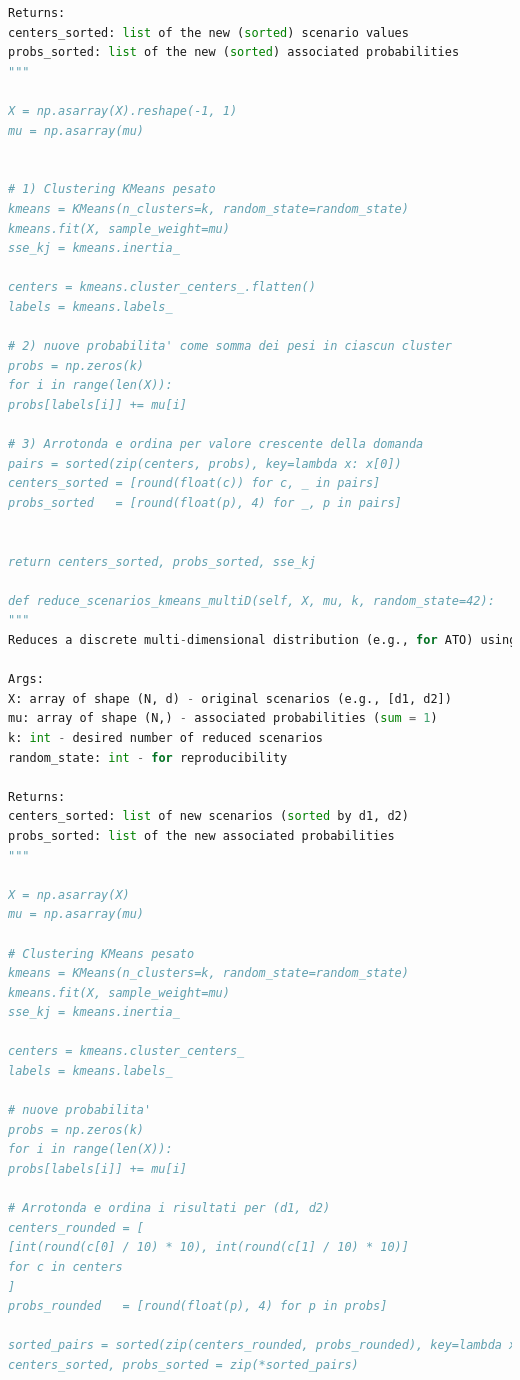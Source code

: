 \documentclass[a4paper,12pt]{article}
\begin{document}
\begin{lstlisting}[language=python,caption={class ScenarioTree},label={lst:class-scenario-tree}]
Returns:
centers_sorted: list of the new (sorted) scenario values
probs_sorted: list of the new (sorted) associated probabilities
"""        

X = np.asarray(X).reshape(-1, 1)
mu = np.asarray(mu)


# 1) Clustering KMeans pesato
kmeans = KMeans(n_clusters=k, random_state=random_state)
kmeans.fit(X, sample_weight=mu)
sse_kj = kmeans.inertia_

centers = kmeans.cluster_centers_.flatten()
labels = kmeans.labels_

# 2) nuove probabilita' come somma dei pesi in ciascun cluster
probs = np.zeros(k)
for i in range(len(X)):
probs[labels[i]] += mu[i]

# 3) Arrotonda e ordina per valore crescente della domanda
pairs = sorted(zip(centers, probs), key=lambda x: x[0])
centers_sorted = [round(float(c)) for c, _ in pairs]
probs_sorted   = [round(float(p), 4) for _, p in pairs]


return centers_sorted, probs_sorted, sse_kj

def reduce_scenarios_kmeans_multiD(self, X, mu, k, random_state=42):
"""
Reduces a discrete multi-dimensional distribution (e.g., for ATO) using weighted KMeans clustering.

Args:
X: array of shape (N, d) - original scenarios (e.g., [d1, d2])
mu: array of shape (N,) - associated probabilities (sum = 1)
k: int - desired number of reduced scenarios
random_state: int - for reproducibility

Returns:
centers_sorted: list of new scenarios (sorted by d1, d2)
probs_sorted: list of the new associated probabilities
"""

X = np.asarray(X)
mu = np.asarray(mu)

# Clustering KMeans pesato
kmeans = KMeans(n_clusters=k, random_state=random_state)
kmeans.fit(X, sample_weight=mu)
sse_kj = kmeans.inertia_

centers = kmeans.cluster_centers_
labels = kmeans.labels_

# nuove probabilita'
probs = np.zeros(k)
for i in range(len(X)):
probs[labels[i]] += mu[i]

# Arrotonda e ordina i risultati per (d1, d2)
centers_rounded = [
[int(round(c[0] / 10) * 10), int(round(c[1] / 10) * 10)]
for c in centers
]
probs_rounded   = [round(float(p), 4) for p in probs]

sorted_pairs = sorted(zip(centers_rounded, probs_rounded), key=lambda x: (x[0][0], x[0][1]))
centers_sorted, probs_sorted = zip(*sorted_pairs)


\end{lstlisting}
\end{document}
